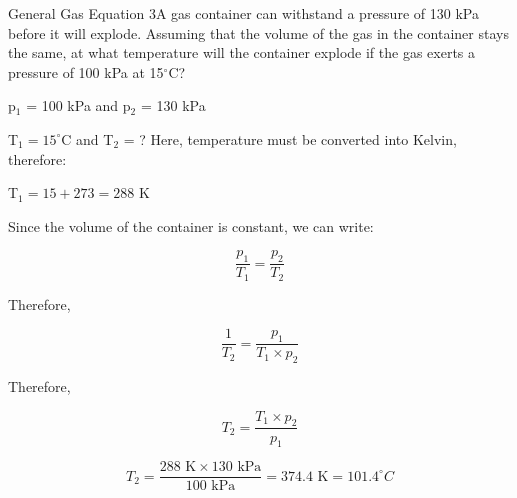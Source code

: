 \begin{wex}{General Gas Equation 3}{A gas container can withstand a pressure of 130 kPa before it will explode. Assuming that the volume of the gas in the container stays the same, at what temperature will the container explode if the gas exerts a pressure of 100 kPa at 15$^{\circ}$C?}
{

p$_{1}$ = 100 kPa and p$_{2}$ = 130 kPa

T$_{1} = 15^{\circ}$C and T$_{2}$ = ?
Here, temperature must be converted into Kelvin, therefore:

T$_{1} = 15 + 273 = 288$ K

Since the volume of the container is constant, we can write:

\begin{equation*}
\frac{p_{1}}{T_{1}} = \frac{p_{2}}{T_{2}}
\end{equation*}

Therefore,

\begin{equation*}
\frac{1}{T_{2}} = \frac{p_{1}}{T_{1} \times p_{2}}
\end{equation*}

Therefore,

\begin{equation*}
T_{2} = \frac{T_{1} \times p_{2}}{p_{1}}
\end{equation*}

\begin{equation*}
T_{2} = \frac{288 \text{ K} \times 130 \text{ kPa}}{100 \text{ kPa}} = 374.4 \text{ K} = 101.4^{\circ}C
\end{equation*}
}
\end{wex}

